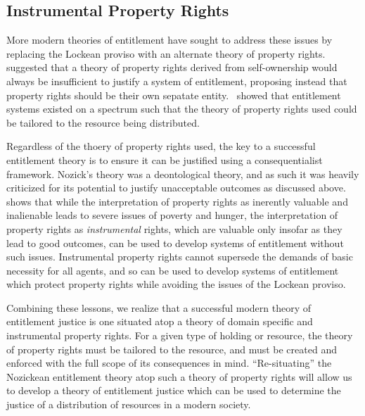\subsection{Instrumental Property Rights}

More modern theories of entitlement have sought to address these issues by
replacing the Lockean proviso with an alternate theory of property
rights.~\cite{Mack_1990} suggested that a theory of property rights derived from
self-ownership would always be insufficient to justify a system of entitlement,
proposing instead that property rights should be their own sepatate
entity.~\cite{Van_der_Veen_1985} showed that entitlement systems existed on a 
spectrum such that the theory of property rights used could be tailored to the
resource being distributed. 

Regardless of the thoery of property rights used, the key to a successful 
entitlement theory is to ensure it can be justified using a consequentialist
framework. Nozick's theory was a deontological theory, and as such it was
heavily criticized for its potential to justify unacceptable outcomes as
discussed above.~\cite{Sen_1988} shows that while the interpretation of property
rights as inerently valuable and inalienable leads to severe issues of poverty
and hunger, the interpretation of property rights as \textit{instrumental} 
rights, which are valuable only insofar as they lead to good outcomes, can
be used to develop systems of entitlement without such issues. Instrumental
property rights cannot supersede the demands of basic necessity for all agents,
and so can be used to develop systems of entitlement which protect property
rights while avoiding the issues of the Lockean proviso.

Combining these lessons, we realize that a successful modern theory of 
entitlement justice is one situated atop a theory of domain specific and 
instrumental property rights. For a given type of holding or resource, the
theory of property rights must be tailored to the resource, and must be created
and enforced with the full scope of its consequences in mind. ``Re-situating''
the Nozickean entitlement theory atop such a theory of property rights will 
allow us to develop a theory of entitlement justice which can be used to
determine the justice of a distribution of resources in a modern society.
